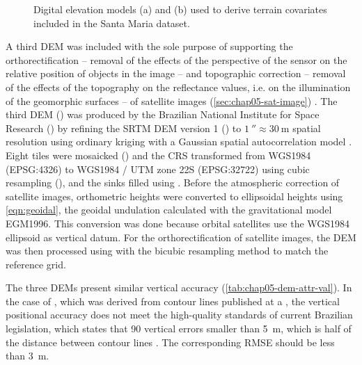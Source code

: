 \begin{figure}[!ht]
\begin{minipage}[b]{0.45\textwidth}
\end{minipage} 
\caption[Digital elevation models included in the Santa Maria dataset.]{Digital elevation models (a) \demOld{} 
and (b) \demNew{} used to derive terrain covariates included in the Santa Maria dataset.}
\label{fig:chap05-dem}
\end{figure}

A third DEM was included with the sole purpose of supporting the orthorectification -- removal of the effects 
of the perspective of the sensor on the relative position of objects in the image -- and topographic correction 
-- removal of the effects of the topography on the reflectance values, i.e. on the illumination of the 
geomorphic surfaces -- of satellite images (\autoref{sec:chap05-sat-image}) \cite{Mather2004, 
Schowengerdt2007}. The third DEM (\topodata) was produced by the Brazilian National Institute for Space 
Research (\inpe) by refining the SRTM DEM version 1 () to $\SI{1}{\arcsecond} \approx 
\SI{30}{\m}$ spatial resolution using ordinary kriging with a Gaussian spatial autocorrelation model 
\cite{ValerianoEtAl2012}. Eight tiles were mosaicked () and the CRS transformed from 
WGS1984 (EPSG:4326) to WGS1984 / UTM zone 22S (EPSG:32722) using cubic resampling (), and the 
sinks filled using . Before the atmospheric correction of satellite images, orthometric 
heights were converted to ellipsoidal heights using \autoref{eqn:geoidal}, the geoidal undulation calculated 
with the gravitational model EGM1996. This conversion was done because orbital satellites use the WGS1984 
ellipsoid as vertical datum. For the orthorectification of satellite images, the DEM was then processed using 
 with the bicubic resampling method to match the reference grid.

The three DEMs present similar vertical accuracy (\autoref{tab:chap05-dem-attr-val}). In the case of \demNew{}, 
which was derived from contour lines published at a , the vertical positional accuracy does not 
meet the high-quality standards of current Brazilian legislation, which states that 90%
vertical errors smaller than \SI{5}{\metre}, which is half of the distance between contour lines 
\cite{Brasil1984}. The corresponding RMSE should be less than \SI{3}{\metre}.


